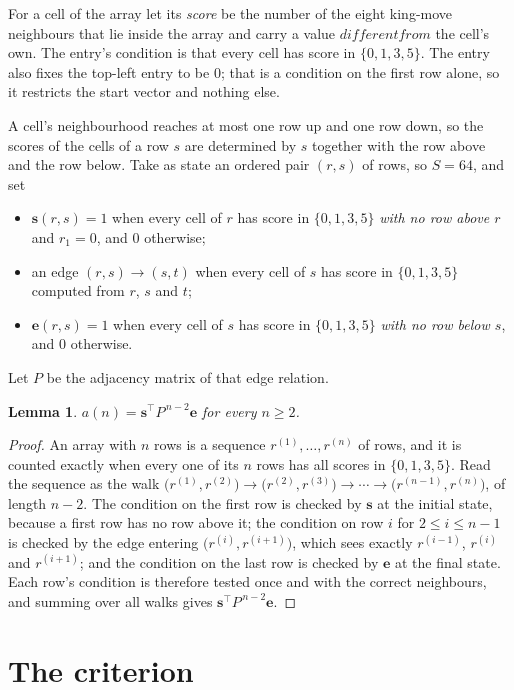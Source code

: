 \documentclass[11pt,a4paper]{article}
\theoremstyle{plain}
\newtheorem{lemma}[theorem]{Lemma}
\theoremstyle{definition}
\begin{document}
For a cell of the array let its \emph{score} be the number of the eight king-move neighbours that lie inside
the array and carry a value $different from$ the cell's own. The entry's condition is that every cell
has score in $\{0,1,3,5\}$. The entry also fixes the top-left entry to be $0$; that is a condition on the first row alone, so it restricts the start vector and nothing else.

A cell's neighbourhood reaches at most one row up and one row down, so the scores of the
cells of a row $s$ are determined by $s$ together with the row above and the row below.
Take as state an ordered pair $(r,s)$ of rows, so $S=64$, and set
\begin{itemize}
\item $\mathbf{s}(r,s)=1$ when every cell of $r$ has score in $\{0,1,3,5\}$ \emph{with no row
above $r$} and $r_1=0$, and $0$ otherwise;
\item an edge $(r,s)\to(s,t)$ when every cell of $s$ has score in $\{0,1,3,5\}$ computed from
$r$, $s$ and $t$;
\item $\mathbf{e}(r,s)=1$ when every cell of $s$ has score in $\{0,1,3,5\}$ \emph{with no row
below $s$}, and $0$ otherwise.
\end{itemize}
Let $P$ be the adjacency matrix of that edge relation.

\begin{lemma}\label{lem:walk}
$a(n)=\mathbf{s}^{\!\top}P^{\,n-2}\mathbf{e}$ for every $n\ge2$.
\end{lemma}

\begin{proof}
An array with $n$ rows is a sequence $r^{(1)},\dots,r^{(n)}$ of rows, and it is counted
exactly when every one of its $n$ rows has all scores in $\{0,1,3,5\}$. Read the sequence as the
walk $\bigl(r^{(1)},r^{(2)}\bigr)\to\bigl(r^{(2)},r^{(3)}\bigr)\to\cdots\to
\bigl(r^{(n-1)},r^{(n)}\bigr)$, of length $n-2$. The condition on the first row is
checked by $\mathbf{s}$ at the initial state, because a first row has no row above it; the
condition on row $i$ for $2\le i\le n-1$ is checked by the edge entering
$\bigl(r^{(i)},r^{(i+1)}\bigr)$, which sees exactly $r^{(i-1)}$, $r^{(i)}$ and
$r^{(i+1)}$; and the condition on the last row is checked by $\mathbf{e}$ at the final
state. Each row's condition is therefore tested once and with the correct neighbours, and
summing over all walks gives $\mathbf{s}^{\!\top}P^{\,n-2}\mathbf{e}$.
\end{proof}

\section{The criterion}
\end{document}
